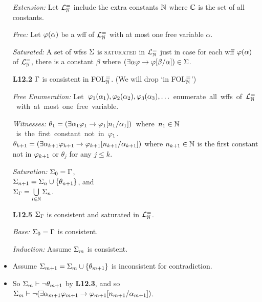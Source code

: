 \documentclass[a4paper, 11pt]{article} %
\begin{document}
\begin{itemize}
  \item[\it Extension:] Let $\mathcal{L}^{=}_{\mathbb{N}}$ include the extra constants $\mathbb{N}$ where $\mathbb{C}$ is the set of all constants.
  \item[\it Free:] Let $\varphi(\alpha)$ be a wff of $\mathcal{L}^{=}_{\mathbb{N}}$ with at most one free variable $\alpha$.
  \item[\it Saturated:] A set of wfss $\Sigma$ is \textsc{saturated} in $\mathcal{L}^{=}_{\mathbb{N}}$ just in case for each wff $\varphi(\alpha)$ of $\mathcal{L}^{=}_{\mathbb{N}}$, there is a constant $\beta$ where $(\exists \alpha\varphi \rightarrow \varphi[\beta/\alpha])\in\Sigma$.
  \item[\bf L12.2] $\Gamma$ is consistent in FOL$^=_{\mathbb{N}}$. \quad(We will drop `in FOL$^=_{\mathbb{N}}$')
  \item[\it Free Enumeration:] \mbox{Let $\varphi_1(\alpha_1),\varphi_2(\alpha_2),\varphi_3(\alpha_3),\ldots$ enumerate all wffs of $\mathcal{L}^{=}_{\mathbb{N}}$ with at most one free variable.}
  \item[\it Witnesses:] \mbox{$\theta_1=(\exists \alpha_1\varphi_1\rightarrow \varphi_1[n_1/\alpha_1])$ where $n_1\in\mathbb{N}$ is the first constant not in $\varphi_1$.}\vspace{.05in}\\
    $\theta_{k+1}=(\exists \alpha_{k+1}\varphi_{k+1}\rightarrow \varphi_{k+1}[n_{k+1}/\alpha_{k+1}])$  where $n_{k+1}\in\mathbb{N}$ is the first constant not in $\varphi_{k+1}$ or $\theta_j$ for any $j\leq k$.
  \item[\it Saturation:]
    $\Sigma_0 = \Gamma$,\\
    $\Sigma_{n+1} = \Sigma_n\cup\lbrace\theta_{n+1}\rbrace$, and\\
    $\Sigma_{\Gamma} = \bigcup\limits_{i\in\mathbb{N}}\Sigma_n$.
  \item[\bf L12.5] $\Sigma_{\Gamma}$ is consistent and saturated in $\mathcal{L}^{=}_{\mathbb{N}}$.
    \item[\it Base:] $\Sigma_0 = \Gamma$ is consistent. 
    \item[\it Induction:] Assume $\Sigma_m$ is consistent. 
    \item Assume $\Sigma_{m+1} = \Sigma_m \cup \lbrace\theta_{m+1}\rbrace$ is inconsistent for contradiction.
    \item So $\Sigma_m \vdash \neg\theta_{m+1}$ by \textbf{L12.3}, and so $\Sigma_m \vdash \neg (\exists \alpha_{m+1}\varphi_{m+1}\rightarrow \varphi_{m+1}[n_{m+1}/\alpha_{m+1}])$.

\end{itemize}
\end{document}
